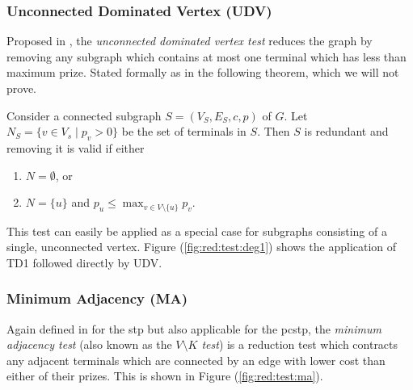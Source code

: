 \subsubsection{Unconnected Dominated Vertex (UDV)}\label{sec:pre:udv}
Proposed in \cite{rehfeldt2016reduction}, the \textit{unconnected dominated vertex test} reduces the
graph by removing any subgraph which contains at most one terminal which has less than maximum prize.
Stated formally as in the following theorem, which we will not prove.
\begin{theorem}
  Consider a connected subgraph $S = (V_S, E_S, c, p)$ of $G$. Let $N_S = \{v \in V_s \mid p_v > 0\}$
  be the set of terminals in $S$. Then $S$ is redundant and removing it is valid if either
  \begin{enumerate}
  \item $N = \emptyset$, or
  \item $N = \{u\}$ and $p_u \leq \max_{v \in V \setminus \{u\}} p_v$.
  \end{enumerate}
\end{theorem}


This test can easily be applied as a special case for subgraphs consisting of a single,
 unconnected vertex.
 Figure (\ref{fig:red:test:deg1}) shows the application
 of TD1 followed directly by UDV.

\subsubsection{Minimum Adjacency (MA)}
Again defined in \cite{duin1989reduction} for the \gls{stp} but also applicable for the \gls{pcstp},
the \textit{minimum adjacency test}
(also known as the \textit{$V \setminus K$ test}) 
is a reduction test which contracts any adjacent
terminals which are connected by an edge with lower cost than either of their prizes.
 This is shown in Figure (\ref{fig:red:test:ma}).
 
